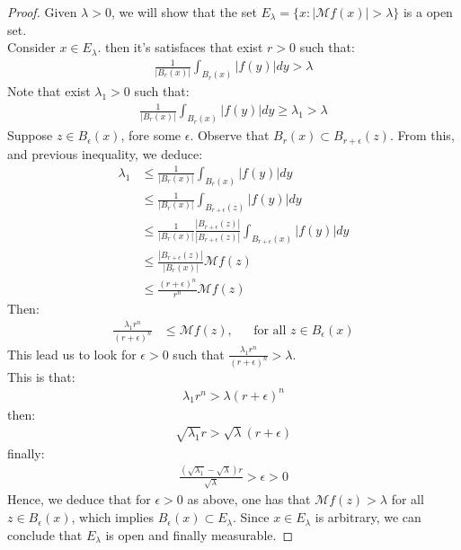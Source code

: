 \begin{proof} 
  Given $\lambda>0$, we will show that  the set $E_{\lambda}=\{x:|\mathcal{M}f(x)|>\lambda\}$ is a open set.\\
  Consider $x\in E_{\lambda}$. then it's satisfaces that exist $r>0$ such that:
  \begin{align*}
    \frac{1}{|B_{r}(x)|}\int_{B_{r}(x)}|f(y)|dy>\lambda
  \end{align*}
  Note that exist $\lambda_1>0$ such that:
  \begin{align*}
    \frac{1}{|B_{r}(x)|}\int_{B_{r}(x)}|f(y)|dy\geq \lambda_1 > \lambda 
  \end{align*}
  Suppose $z\in B_{\epsilon}(x)$, fore some $\epsilon$. Observe that $B_{r}(x)\subset B_{r+\epsilon}(z)$. From this, and previous inequality, we deduce:
  \begin{align*}
    \lambda_1&\leq \frac{1}{|B_{r}(x)|}\int_{B_{r}(x)}|f(y)|dy\\
    &\leq \frac{1}{|B_{r}(x)|}\int_{B_{r+\epsilon}(z)}|f(y)|dy\\
    &\leq \frac{1}{|B_{r}(x)|}\frac{|B_{r+\epsilon}(z)|}{|B_{r+\epsilon}(z)|}\int_{B_{r+\epsilon}(x)}|f(y)|dy\\
    &\leq \frac{|B_{r+\epsilon}(z)|}{|B_{r}(x)|}\mathcal{M}f(z)\\
    &\leq \frac{(r+\epsilon)^{n}}{r^{n}}\mathcal{M}f(z)
  \end{align*}
  Then:
  \begin{align*}
    \frac{\lambda_1 r^{n}}{(r+\epsilon)^n}&\leq \mathcal{M}f(z), &&\text{for all $z\in B_{\epsilon}(x)$}
  \end{align*}
  This lead us to look for $\epsilon>0$ such that $\frac{\lambda_1 r^{n}}{(r+\epsilon)^{n}}>\lambda$.\\
  This is that:
  \begin{align*}
    \lambda_1r^n>\lambda(r+\epsilon)^{n}
  \end{align*}
  then:
  \begin{align*}
    \sqrt{\lambda_1}r > \sqrt{\lambda}(r+\epsilon)
  \end{align*}
  finally:
  \begin{align*}
    \frac{(\sqrt{\lambda_1}-\sqrt{\lambda})r}{\sqrt{\lambda}}>\epsilon>0
  \end{align*}
  Hence, we deduce that for $\epsilon>0$ as above, one has that $\mathcal{M}f(z)>\lambda$ for all $z\in B_{\epsilon}(x)$, which implies $B_{\epsilon}(x)\subset E_{\lambda}$. Since $x\in E_{\lambda}$ is arbitrary, we can conclude that $E_{\lambda}$ is open and finally measurable. 
\end{proof}


